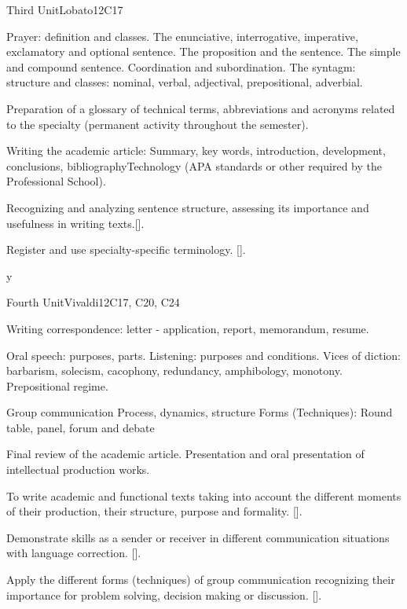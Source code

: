 \begin{syllabus}
\begin{unit}{}{Third Unit}{Lobato}{12}{C17}
\begin{topics}
   \item Prayer: definition and classes. The enunciative, interrogative, imperative, exclamatory and optional sentence. The proposition and the sentence. The simple and compound sentence. Coordination and subordination. The syntagm: structure and classes: nominal, verbal, adjectival, prepositional, adverbial.
   \item Preparation of a glossary of technical terms, abbreviations and acronyms related to the specialty (permanent activity throughout the semester).
   \item Writing the academic article: Summary, key words, introduction, development, conclusions, bibliographyTechnology (APA standards or other required by the Professional School).
\end{topics}
\begin{learningoutcomes}
   \item Recognizing and analyzing sentence structure, assessing its importance and usefulness in writing texts.[\Usage].
   \item Register and use specialty-specific terminology. [\Usage].
\end{learningoutcomes}
\end{unit}
y
\begin{unit}{}{Fourth Unit}{Vivaldi}{12}{C17, C20, C24}
\begin{topics}
   \item Writing correspondence: letter - application, report, memorandum, resume.
   \item Oral speech: purposes, parts. Listening: purposes and conditions. Vices of diction: barbarism, solecism, cacophony, redundancy, amphibology, monotony. Prepositional regime.
   \item Group communication Process, dynamics, structure Forms (Techniques): Round table, panel, forum and debate
   \item Final review of the academic article. Presentation and oral presentation of intellectual production works.
\end{topics}
\begin{learningoutcomes}
   \item To write academic and functional texts taking into account the different moments of their production, their structure, purpose and formality. [\Usage].
   \item Demonstrate skills as a sender or receiver in different communication situations with language correction. [\Usage].
   \item Apply the different forms (techniques) of group communication recognizing their importance for problem solving, decision making or discussion. [\Usage].
\end{learningoutcomes}
\end{unit}

\begin{coursebibliography}
\end{coursebibliography}

\end{syllabus}
